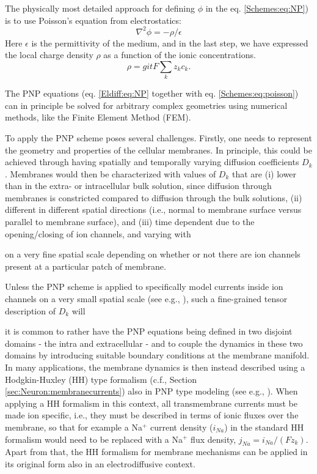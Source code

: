 \subsubsection{}
\label{sec:Schemes:PNP}
The physically most detailed approach for defining $\phi$ in the eq. \ref{Schemes:eq:NP}) is to use Poisson's equation from electrostatics:
\begin{equation}
\nabla^2 \phi = -\rho/\epsilon
\label{Schemes:eq:poisson}
\end{equation}
Here $\epsilon$ is the permittivity of the medium, and in the last step, we have expressed the local charge density $\rho$ as a function of the ionic concentrations. 
\begin{equation}
\rho =git  F\sum_k z_k c_k.
\label{Schemes:eq:PNPrho}
\end{equation}

The PNP equations (eq. \ref{Eldiff:eq:NP} together with eq. \ref{Schemes:eq:poisson}) can in principle be solved for arbitrary complex geometries using numerical methods, like the Finite Element Method (FEM). 

To apply the PNP scheme poses several challenges. Firstly, one needs to represent the geometry and properties of the cellular membranes. In principle, this could be achieved through having spatially and temporally varying diffusion coefficients $D_k$. Membranes would then be characterized with values of $D_k$ that are (i) lower than in the extra- or intracellular bulk solution, since diffusion through membranes is constricted compared to diffusion through the bulk solutions, (ii) different in different spatial directions (i.e., normal to membrane surface versus parallel to membrane surface), and (iii) time dependent due to the opening/closing of ion channels, and varying with 

on a very fine spatial scale depending on whether or not there are ion channels present at a particular patch of membrane. 

Unless the PNP scheme is applied to specifically model currents inside ion channels on a very small spatial scale (see e.g., \citep{Gardner2011, Zheng2011}), such a fine-grained tensor description of $D_k$ will 

it is common to rather have the PNP equations being defined in two disjoint domains - the intra and extracellular - and to couple the dynamics in these two domains by introducing suitable boundary conditions at the membrane manifold. In many applications, the membrane dynamics is then instead described using a Hodgkin-Huxley (HH) type formalism (c.f., Section \ref{sec:Neuron:membranecurrents}) also in PNP type modeling (see e.g., \citep{Lopreore2008, Pods2013, Gardner2015, Pods2017}). When applying a HH formalism in this context, all transmembrane currents must be made ion specific, i.e., they must be described in terms of ionic fluxes over the membrane, so that for example a Na$^+$ current density ($i_{Na}$) in the standard HH formalism would need to be replaced with a Na$^+$ flux density, $j_{Na} = i_{Na}/(Fz_k)$. Apart from that, the HH formalism for membrane mechanisms can be applied in its original form also in an electrodiffusive context.

